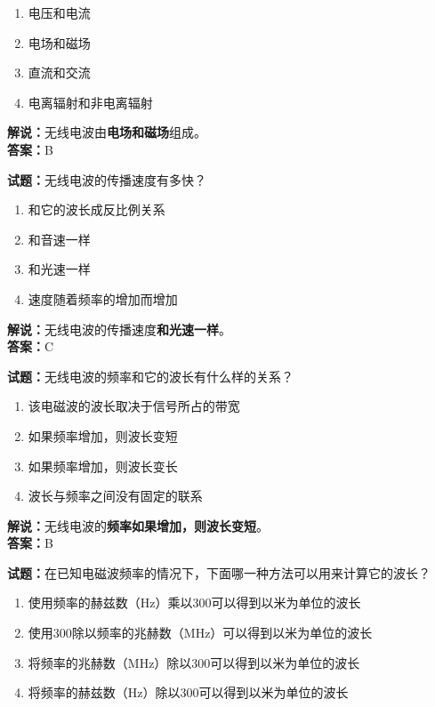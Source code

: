 \documentclass{ctexbook}
\begin{document}
\begin{enumerate}[leftmargin=3em]
	\item 电压和电流
	\item 电场和磁场
	\item 直流和交流
	\item 电离辐射和非电离辐射
\end{enumerate}

\noindent\textbf{解说：}无线电波由\textbf{电场和磁场}组成。\\\noindent\textbf{答案：}B


\bigskip


\noindent\textbf{试题：}无线电波的传播速度有多快？

\begin{enumerate}[leftmargin=3em]
	\item 和它的波长成反比例关系
	\item 和音速一样
	\item 和光速一样
	\item 速度随着频率的增加而增加
\end{enumerate}

\noindent\textbf{解说：}无线电波的传播速度\textbf{和光速一样}。\\\noindent\textbf{答案：}C


\bigskip


\noindent\textbf{试题：}无线电波的频率和它的波长有什么样的关系？

\begin{enumerate}[leftmargin=3em]
	\item 该电磁波的波长取决于信号所占的带宽
	\item 如果频率增加，则波长变短
	\item 如果频率增加，则波长变长
	\item 波长与频率之间没有固定的联系
\end{enumerate}

\noindent\textbf{解说：}无线电波的\textbf{频率如果增加，则波长变短}。\\\noindent\textbf{答案：}B


\bigskip


\noindent\textbf{试题：}在已知电磁波频率的情况下，下面哪一种方法可以用来计算它的波长？

\begin{enumerate}[leftmargin=3em]
	\item 使用频率的赫兹数（Hz）乘以300可以得到以米为单位的波长
	\item 使用300除以频率的兆赫数（\si{\MHz}）可以得到以米为单位的波长
	\item 将频率的兆赫数（\si{\MHz}）除以300可以得到以米为单位的波长
	\item 将频率的赫兹数（Hz）除以300可以得到以米为单位的波长
\end{enumerate}
\end{document}
